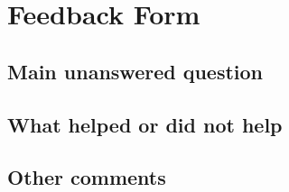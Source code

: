\documentclass[12pt,a4paper]{article}
\begin{document}
\thispagestyle{empty}

\section*{Feedback Form}

\subsection*{Main unanswered question}
\begin{framed}
  \hfill\vspace{5cm}
\end{framed}

\subsection*{What helped or did not help}
\begin{framed}
  \hfill\vspace{5cm}
\end{framed}

\subsection*{Other comments}
\begin{framed}
  \hfill\vspace{5cm}
\end{framed}
\end{document}
